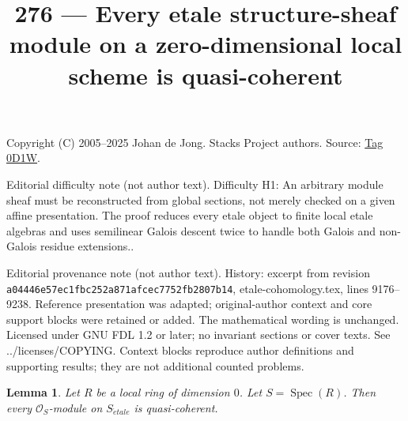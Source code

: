 \documentclass{amsart}
\theoremstyle{plain}
\newtheorem{lemma}[subsection]{Lemma}
\theoremstyle{definition}
\theoremstyle{remark}
\numberwithin{equation}{subsection}
\def\Spec{\mathop{\mathrm{Spec}}}
\def\etale{{\acute{e}tale}}
\begin{document}
\title[Stacks Project, Tag 0D1W]{276 --- Every etale structure-sheaf module on a zero-dimensional local scheme is quasi-coherent}
\maketitle
\noindent Copyright (C) 2005--2025 Johan de Jong. Stacks Project authors. Source: \href{https://stacks.math.columbia.edu/tag/0D1W}{Tag 0D1W}.

\noindent Editorial difficulty note (not author text). Difficulty H1: An arbitrary module sheaf must be reconstructed from global sections, not merely checked on a given affine presentation. The proof reduces every etale object to finite local etale algebras and uses semilinear Galois descent twice to handle both Galois and non-Galois residue extensions..

\noindent Editorial provenance note (not author text). History: excerpt from revision \texttt{a0444\allowbreak 6e57e\allowbreak c1fbc\allowbreak 252a8\allowbreak 71afc\allowbreak ec775\allowbreak 2fb28\allowbreak 07b14}, etale-cohomology.tex, lines 9176--9238. Reference presentation was adapted; original-author context and core support blocks were retained or added. The mathematical wording is unchanged. Licensed under GNU FDL 1.2 or later; no invariant sections or cover texts. See ../licenses/COPYING. Context blocks reproduce author definitions and supporting results; they are not additional counted problems.

\begin{lemma}
\label{lemma-all-modules-quasi-coherent}
Let $R$ be a local ring of dimension $0$. Let $S = \Spec(R)$.
Then every $\mathcal{O}_S$-module on $S_\etale$ is quasi-coherent.
\end{lemma}
\end{document}
